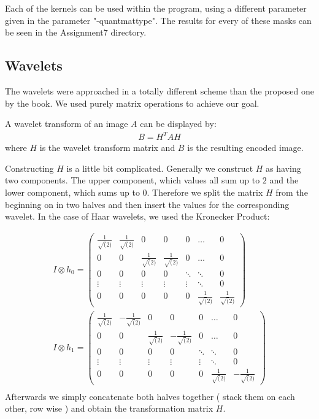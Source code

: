 Each of the kernels can be used within the program, using a different parameter given in the parameter "-quantmattype". The results for every of these masks can be seen in the Assignment7 directory.



\subsection{Wavelets}

The wavelets were approached in a totally different scheme than the proposed one by the book. We used purely matrix operations to achieve our goal.

A wavelet transform of an image $A$ can be displayed by:
\begin{gather*}
B = H^T A H
\end{gather*}
where $H$ is the wavelet transform matrix and $B$ is the resulting encoded image.

Constructing $H$ is a little bit complicated. Generally we construct $H$ as having two components. The upper component, which values all sum up to $2$ and the lower component, which sums up to $0$. Therefore we split the matrix $H$ from the beginning on in two halves and then insert the values for the corresponding wavelet.
In the case of Haar wavelets, we used the Kronecker Product:

\begin{gather*}
I \otimes h_0 = \left( \begin{array}{ccccccc}
\frac{1}{\sqrt(2)} & \frac{1}{\sqrt(2)} & 0 & 0 & 0 & \ldots & 0 \\
0 & 0 & \frac{1}{\sqrt(2)} & \frac{1}{\sqrt(2)} & 0 & \ldots & 0 \\
0 & 0 & 0 & 0 & \ddots & \ddots & 0 \\
\vdots & \vdots & \vdots & \vdots & \vdots & \ddots & 0\\
0 & 0 & 0 & 0 & 0 & \frac{1}{\sqrt(2)} & \frac{1}{\sqrt(2)}
\end{array} \right)\\
I \otimes h_1 = \left( \begin{array}{ccccccc}
\frac{1}{\sqrt(2)} & -\frac{1}{\sqrt(2)} & 0 & 0 & 0 & \ldots & 0 \\
0 & 0 & \frac{1}{\sqrt(2)} & -\frac{1}{\sqrt(2)} & 0 & \ldots & 0 \\
0 & 0 & 0 & 0 & \ddots & \ddots & 0 \\
\vdots & \vdots & \vdots & \vdots & \vdots & \ddots & 0\\
0 & 0 & 0 & 0 & 0 & \frac{1}{\sqrt(2)} & -\frac{1}{\sqrt(2)}
\end{array} \right)\\
\end{gather*}
Afterwards we simply concatenate both halves together ( stack them on each other, row wise ) and obtain the transformation matrix $H$.

